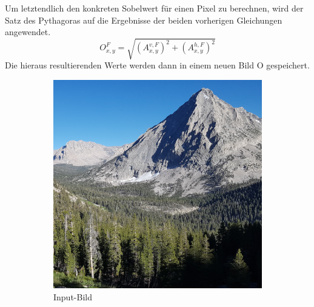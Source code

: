 \documentclass[course=erap]{aspdoc}
\begin{document}
Um letztendlich den konkreten Sobelwert für einen Pixel zu berechnen, wird der Satz des Pythagoras auf die Ergebnisse der beiden vorherigen Gleichungen angewendet.
\begin{equation}
    O^{F}_{x,y} = \sqrt{(A^{v,F}_{x,y})^2 + (A^{h,F}_{x,y})^2}
    \label{eq:wurzel}
\end{equation}
Die hieraus resultierenden Werte werden dann in einem neuen Bild O gespeichert.
\begin{figure}[H]
    \begin{subfigure}{.5\columnwidth}
        \centering
        \includegraphics[width=\columnwidth]{graphics/johnmuirtrail}
        \caption{Input-Bild}
        \label{fig:input-bild}
    \end{subfigure}
    \begin{subfigure}{.5\columnwidth}
        \centering

\end{subfigure}
\end{figure}
\end{document}

